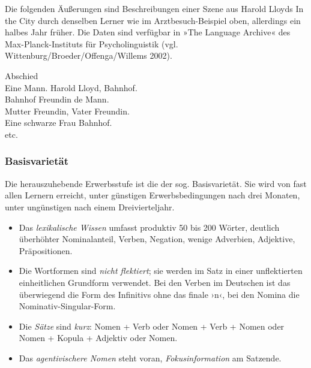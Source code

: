 \documentclass[
  letterpaper,
]{scrbook}
\providecommand{\tightlist}{%
  \setlength{\itemsep}{0pt}\setlength{\parskip}{0pt}}\usepackage{longtable,booktabs,array}
\begin{document}
\begin{tcolorbox}[enhanced jigsaw, arc=.35mm, left=2mm, bottomrule=.15mm, toprule=.15mm, colframe=quarto-callout-note-color-frame, breakable, rightrule=.15mm, opacityback=0, colback=white, leftrule=.75mm]
\begin{minipage}[t]{5.5mm}
\textcolor{quarto-callout-note-color}{\faInfo}
\end{minipage}%
\begin{minipage}[t]{\textwidth - 5.5mm}

Die folgenden Äußerungen sind Beschreibungen einer Szene aus Harold
Lloyds In the City durch denselben Lerner wie im Arztbesuch-Beispiel
oben, allerdings ein halbes Jahr früher. Die Daten sind verfügbar in
»The Language Archive« des Max-Planck-Instituts für Psycholinguistik
(vgl. Wittenburg/Broeder/Offenga/Willems 2002).

Abschied\\
Eine Mann. Harold Lloyd, Bahnhof.\\
Bahnhof Freundin de Mann.\\
Mutter Freundin, Vater Freundin.\\
Eine schwarze Frau Bahnhof.\\
etc.

\end{minipage}%
\end{tcolorbox}

\hypertarget{basisvarietuxe4t}{%
\subsubsection{Basisvarietät}\label{basisvarietuxe4t}}

Die herauszuhebende Erwerbsstufe ist die der sog. Basisvarietät. Sie
wird von fast allen Lernern erreicht, unter günstigen Erwerbsbedingungen
nach drei Monaten, unter ungünstigen nach einem Dreivierteljahr.

\begin{itemize}
\tightlist
\item
  Das \emph{lexikalische Wissen} umfasst produktiv 50 bis 200 Wörter,
  deutlich überhöhter Nominalanteil, Verben, Negation, wenige Adverbien,
  Adjektive, Präpositionen.\\
\item
  Die Wortformen sind \emph{nicht flektiert}; sie werden im Satz in
  einer unflektierten einheitlichen Grundform verwendet. Bei den Verben
  im Deutschen ist das überwiegend die Form des Infinitivs ohne das
  finale ›n‹, bei den Nomina die Nominativ-Singular-Form.\\
\item
  Die \emph{Sätze} sind \emph{kurz}: Nomen + Verb oder Nomen + Verb +
  Nomen oder Nomen + Kopula + Adjektiv oder Nomen.\\
\item
  Das \emph{agentivischere Nomen} steht voran, \emph{Fokusinformation}
  am Satzende.
\end{itemize}
\end{document}
